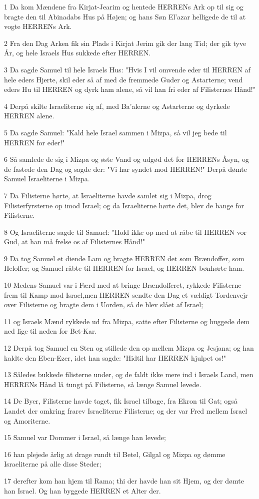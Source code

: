 \par 1 Da kom Mændene fra Kirjat-Jearim og hentede HERRENs Ark op til sig og bragte den til Abinadabs Hus på Højen; og hans Søn El'azar helligede de til at vogte HERRENs Ark.
\par 2 Fra den Dag Arken fik sin Plads i Kirjat Jerim gik der lang Tid; der gik tyve År, og hele Israels Hus sukkede efter HERREN.
\par 3 Da sagde Samuel til hele Israels Hus: "Hvis I vil omvende eder til HERREN af hele eders Hjerte, skil eder så af med de fremmede Guder og Astarterne; vend eders Hu til HERREN og dyrk ham alene, så vil han fri eder af Filisternes Hånd!"
\par 4 Derpå skilte Israeliterne sig af, med Ba'alerne og Astarterne og dyrkede HERREN alene.
\par 5 Da sagde Samuel: "Kald hele Israel sammen i Mizpa, så vil jeg bede til HERREN for eder!"
\par 6 Så samlede de sig i Mizpa og øste Vand og udgød det for HERRENs Åsyn, og de fastede den Dag og sagde der: "Vi har syndet mod HERREN!" Derpå dømte Samuel Israeliterne i Mizpa.
\par 7 Da Filisterne hørte, at Israeliterne havde samlet sig i Mizpa, drog Filisterfyrsterne op imod Israel; og da Israeliterne hørte det, blev de bange for Filisterne.
\par 8 Og Israeliterne sagde til Samuel: "Hold ikke op med at råbe til HERREN vor Gud, at han må frelse os af Filisternes Hånd!"
\par 9 Da tog Samuel et diende Lam og bragte HERREN det som Brændoffer, som Heloffer; og Samuel råbte til HERREN for Israel, og HERREN bønhørte ham.
\par 10 Medens Samuel var i Færd med at bringe Brændofferet, rykkede Filisterne frem til Kamp mod Israel,men HERREN sendte den Dag et vældigt Tordenvejr over Filisterne og bragte dem i Uorden, så de blev slået af Israel;
\par 11 og Israels Mænd rykkede ud fra Mizpa, satte efter Filisterne og huggede dem ned lige til neden for Bet-Kar.
\par 12 Derpå tog Samuel en Sten og stillede den op mellem Mizpa og Jesjana; og han kaldte den Eben-Ezer, idet han sagde: "Hidtil har HERREN hjulpet os!"
\par 13 Således bukkede filisterne under, og de faldt ikke mere ind i Israels Land, men HERRENs Hånd lå tungt på Filisterne, så længe Samuel levede.
\par 14 De Byer, Filisterne havde taget, fik Israel tilbage, fra Ekron til Gat; også Landet der omkring frarev Israeliterne Filisterne; og der var Fred mellem Israel og Amoriterne.
\par 15 Samuel var Dommer i Israel, så længe han levede;
\par 16 han plejede årlig at drage rundt til Betel, Gilgal og Mizpa og dømme Israeliterne på alle disse Steder;
\par 17 derefter kom han hjem til Rama; thi der havde han sit Hjem, og der dømte han Israel. Og han byggede HERREN et Alter der.

